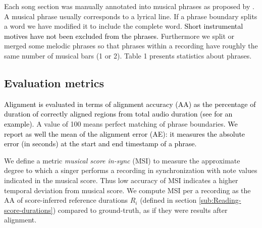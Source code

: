 \documentclass{article}
\begin{document}
Each song section was manually annotated into musical phrases as proposed
by  {{} \cite{karaosmanouglu2014symbolic}}. A musical
phrase usually corresponds to a lyrical line. If a phrase boundary
splits a word we have modified it to include the complete word. \textcolor{black}{Short
instrumental motives have not been excluded from the phrases. }Furthermore
we split or merged some melodic phrases so that phrases within a recording
have roughly the same number of musical bars (1 or 2). Table 1 presents
statistics about phrases. 




\begin{table}
{\small \par}

{\small{}\vspace*{-0.3cm}
 \protect\caption{Section and phrase statistics for test dataset.}
}{\small \par}

{\small{}\label{tab:dataset-stats} }%

\end{table}



\subsection{Evaluation metrics\label{sub:Evaluation-metric}}

\textcolor{black}{Alignment is evaluated in terms of alignment accuracy
(AA) as the percentage of duration of correctly aligned regions from
total audio duration (see \cite[Fig.9]{fujihara2011lyricsynchronizer}
for an example). }A value of 100 means perfect matching of phrase
boundaries\textcolor{black}{. We report as well the mean of the alignment error (AE): it measures the absolute error (in seconds) at the start and end timestamp
of a phrase. }

We define a metric \emph{musical score in-sync} (MSI) to measure the
approximate degree to which a singer performs a recording in synchronization
with note values indicated in the musical score. Thus low accuracy
of MSI indicates a higher temporal deviation from musical score. We
compute\emph{ }MSI per a recording as the AA of score-inferred reference
durations $R_{i}$ (defined in section \ref{sub:Reading-score-durations})
compared to ground-truth, as if they were results after alignment.
\end{document}
